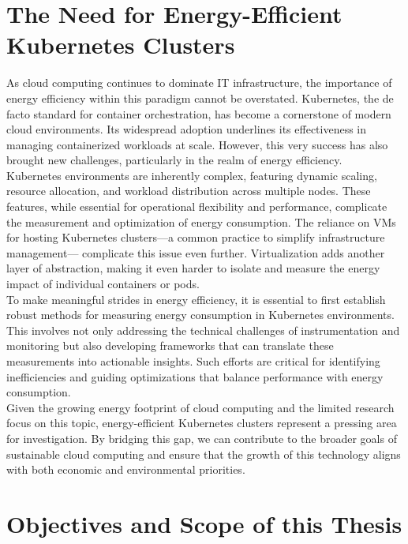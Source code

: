\section{The Need for Energy-Efficient Kubernetes Clusters}

As cloud computing continues to dominate IT infrastructure, the importance of energy efficiency within this paradigm cannot be overstated. Kubernetes, the de facto standard for container orchestration, has become a cornerstone of modern cloud environments. Its widespread adoption underlines its effectiveness in managing containerized workloads at scale. However, this very success has also brought new challenges, particularly in the realm of energy efficiency.\\
Kubernetes environments are inherently complex, featuring dynamic scaling, resource allocation, and workload distribution across multiple nodes. These features, while essential for operational flexibility and performance, complicate the measurement and optimization of energy consumption. The reliance on VMs for hosting Kubernetes clusters—a common practice to simplify infrastructure management— complicate this issue even further. Virtualization adds another layer of abstraction, making it even harder to isolate and measure the energy impact of individual containers or pods.\\
To make meaningful strides in energy efficiency, it is essential to first establish robust methods for measuring energy consumption in Kubernetes environments. This involves not only addressing the technical challenges of instrumentation and monitoring but also developing frameworks that can translate these measurements into actionable insights. Such efforts are critical for identifying inefficiencies and guiding optimizations that balance performance with energy consumption.\\
Given the growing energy footprint of cloud computing and the limited research focus on this topic, energy-efficient Kubernetes clusters represent a pressing area for investigation. By bridging this gap, we can contribute to the broader goals of sustainable cloud computing and ensure that the growth of this technology aligns with both economic and environmental priorities.\\

\section{Objectives and Scope of this Thesis}

